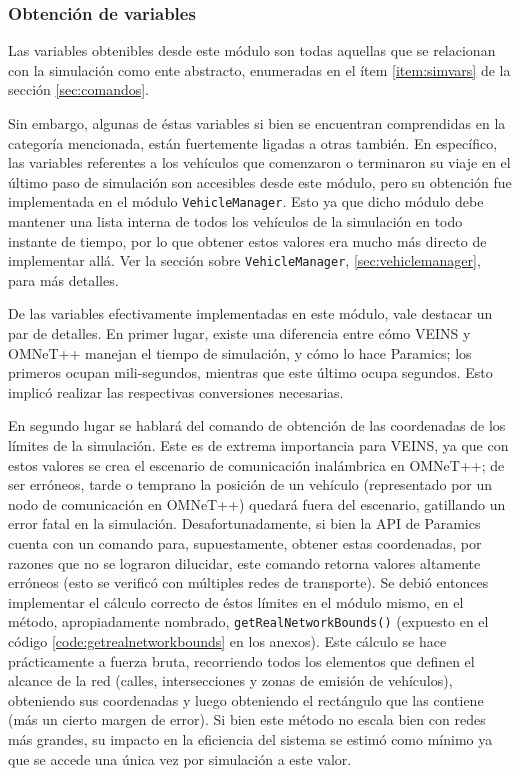 \subsubsection{Obtención de variables}

Las variables obtenibles desde este módulo son todas aquellas que se relacionan con la simulación como ente abstracto, enumeradas en el ítem \ref{item:simvars} de la sección \ref{sec:comandos}.

Sin embargo, algunas de éstas variables si bien se encuentran comprendidas en la categoría mencionada, están fuertemente ligadas a otras también. En específico, las variables referentes a los vehículos que comenzaron o terminaron su viaje en el último paso de simulación son accesibles desde este módulo, pero su obtención fue implementada en el módulo \texttt{VehicleManager}. Esto ya que dicho módulo debe mantener una lista interna de todos los vehículos de la simulación en todo instante de tiempo, por lo que obtener estos valores era mucho más directo de implementar allá. Ver la sección sobre \texttt{VehicleManager}, \ref{sec:vehiclemanager}, para más detalles.

De las variables efectivamente implementadas en este módulo, vale destacar un par de detalles. En primer lugar, existe una diferencia entre cómo VEINS y OMNeT++ manejan el tiempo de simulación, y cómo lo hace Paramics; los primeros ocupan mili-segundos, mientras que este último ocupa segundos. Esto implicó realizar las respectivas conversiones necesarias.

En segundo lugar se hablará del comando de obtención de las coordenadas de los límites de la simulación. Este es de extrema importancia para VEINS, ya que con estos valores se crea el escenario de comunicación inalámbrica en OMNeT++; de ser erróneos, tarde o temprano la posición de un vehículo (representado por un nodo de comunicación en OMNeT++) quedará fuera del escenario, gatillando un error fatal en la simulación. 
Desafortunadamente, si bien la API de Paramics cuenta con un comando para, supuestamente, obtener estas coordenadas, por razones que no se lograron dilucidar, este comando retorna valores altamente erróneos (esto se verificó con múltiples redes de transporte).
Se debió entonces implementar el cálculo correcto de éstos límites en el módulo mismo, en el método, apropiadamente nombrado, \texttt{getRealNetworkBounds()} (expuesto en el código \ref{code:getrealnetworkbounds} en los anexos). Este cálculo se hace prácticamente a fuerza bruta, recorriendo todos los elementos que definen el alcance de la red (calles, intersecciones y zonas de emisión de vehículos), obteniendo sus coordenadas y luego obteniendo el rectángulo que las contiene (más un cierto margen de error).
Si bien este método no escala bien con redes más grandes, su impacto en la eficiencia del sistema se estimó como mínimo ya que se accede una única vez por simulación a este valor.


